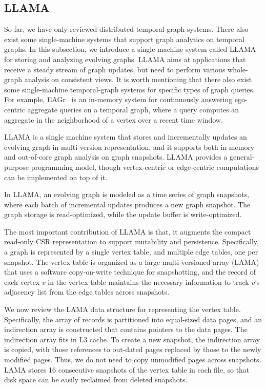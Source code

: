 \documentclass{svjour3}
\begin{document}
\subsection{LLAMA}
So far, we have only reviewed distributed temporal-graph systems. There also exist some single-machine systems that support graph analytics on temporal graphs. In this subsection, we introduce a single-machine system called LLAMA~\cite{llama} for storing and analyzing evolving graphs. LLAMA aims at applications that receive a steady stream of graph updates, but need to perform various whole-graph analysis on consistent views. It is worth mentioning that there also exist some single-machine temporal-graph systems for specific types of graph queries. For example, EAGr~\cite{eagr} is an in-memory system for continuously answering ego-centric aggregate queries on a temporal graph, where a query computes an aggregate in the neighborhood of a vertex over a recent time window.

LLAMA is a single machine system that stores and incrementally updates an evolving graph in multi-version representation, and it supports both in-memory and out-of-core graph analysis on graph snapshots. LLAMA provides a general-purpose programming model, though vertex-centric or edge-centric computations can be implemented on top of it.

In LLAMA, an evolving graph is modeled as a time series of graph snapshots, where each batch of incremental updates produces a new graph snapshot. The graph storage is read-optimized, while the update buffer is write-optimized.

The most important contribution of LLAMA is that, it augments the compact read-only CSR representation to support mutability and persistence. Specifically, a graph is represented by a single vertex table, and multiple edge tables, one per snapshot. The vertex table is organized as a large multi-versioned array (LAMA) that uses a software copy-on-write technique for snapshotting, and the record of each vertex $v$ in the vertex table maintains the necessary information to track $v$'s adjacency list from the edge tables across snapshots.

We now review the LAMA data structure for representing the vertex table. Specifically, the array of records is partitioned into equal-sized data pages, and an indirection array is constructed that contains pointers to the data pages. The indirection array fits in L3 cache. To create a new snapshot, the indirection array is copied, with those references to out-dated pages replaced by those to the newly modified pages. Thus, we do not need to copy unmodified pages across snapshots. LAMA stores 16 consecutive snapshots of the vertex table in each file, so that disk space can be easily reclaimed from deleted snapshots.
\end{document}
